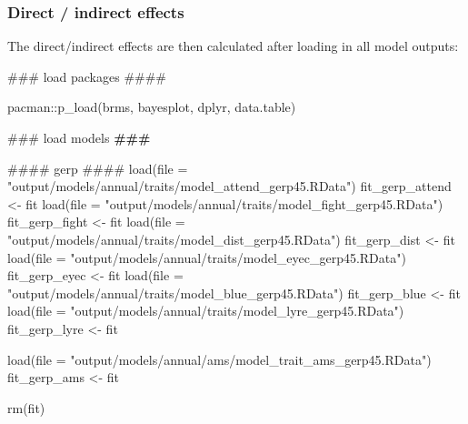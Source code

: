 \documentclass[
  letterpaper,
  DIV=11,
  numbers=noendperiod]{scrreprt}
\newenvironment{Shaded}{}{}
\newcommand{\AlertTok}[1]{\textcolor[rgb]{1.00,0.33,0.33}{\textbf{#1}}}
\newcommand{\AttributeTok}[1]{\textcolor[rgb]{0.84,0.23,0.29}{#1}}
\newcommand{\DocumentationTok}[1]{\textcolor[rgb]{0.42,0.45,0.49}{#1}}
\newcommand{\FunctionTok}[1]{\textcolor[rgb]{0.44,0.26,0.76}{#1}}
\newcommand{\NormalTok}[1]{\textcolor[rgb]{0.14,0.16,0.18}{#1}}
\newcommand{\OtherTok}[1]{\textcolor[rgb]{0.44,0.26,0.76}{#1}}
\newcommand{\SpecialCharTok}[1]{\textcolor[rgb]{0.00,0.36,0.77}{#1}}
\newcommand{\StringTok}[1]{\textcolor[rgb]{0.01,0.18,0.38}{#1}}
\begin{document}
\hypertarget{direct-indirect-effects}{%
\subsubsection{Direct / indirect
effects}\label{direct-indirect-effects}}

The direct/indirect effects are then calculated after loading in all
model outputs:

\begin{Shaded}
\begin{Highlighting}[]
\DocumentationTok{\#\#\# load packages \#\#\#\#}

\NormalTok{pacman}\SpecialCharTok{::}\FunctionTok{p\_load}\NormalTok{(brms, bayesplot, dplyr, data.table)}

\DocumentationTok{\#\#\# load models }\AlertTok{\#\#\#}

\DocumentationTok{\#\#\#\# gerp \#\#\#\#}
\FunctionTok{load}\NormalTok{(}\AttributeTok{file =} \StringTok{"output/models/annual/traits/model\_attend\_gerp45.RData"}\NormalTok{)}
\NormalTok{fit\_gerp\_attend }\OtherTok{\textless{}{-}}\NormalTok{ fit}
\FunctionTok{load}\NormalTok{(}\AttributeTok{file =} \StringTok{"output/models/annual/traits/model\_fight\_gerp45.RData"}\NormalTok{)}
\NormalTok{fit\_gerp\_fight }\OtherTok{\textless{}{-}}\NormalTok{ fit}
\FunctionTok{load}\NormalTok{(}\AttributeTok{file =} \StringTok{"output/models/annual/traits/model\_dist\_gerp45.RData"}\NormalTok{)}
\NormalTok{fit\_gerp\_dist }\OtherTok{\textless{}{-}}\NormalTok{ fit}
\FunctionTok{load}\NormalTok{(}\AttributeTok{file =} \StringTok{"output/models/annual/traits/model\_eyec\_gerp45.RData"}\NormalTok{)}
\NormalTok{fit\_gerp\_eyec }\OtherTok{\textless{}{-}}\NormalTok{ fit}
\FunctionTok{load}\NormalTok{(}\AttributeTok{file =} \StringTok{"output/models/annual/traits/model\_blue\_gerp45.RData"}\NormalTok{)}
\NormalTok{fit\_gerp\_blue }\OtherTok{\textless{}{-}}\NormalTok{ fit}
\FunctionTok{load}\NormalTok{(}\AttributeTok{file =} \StringTok{"output/models/annual/traits/model\_lyre\_gerp45.RData"}\NormalTok{)}
\NormalTok{fit\_gerp\_lyre }\OtherTok{\textless{}{-}}\NormalTok{ fit}

\FunctionTok{load}\NormalTok{(}\AttributeTok{file =} \StringTok{"output/models/annual/ams/model\_trait\_ams\_gerp45.RData"}\NormalTok{)}
\NormalTok{fit\_gerp\_ams }\OtherTok{\textless{}{-}}\NormalTok{ fit}

\FunctionTok{rm}\NormalTok{(fit)}


\end{Highlighting}
\end{Shaded}
\end{document}
